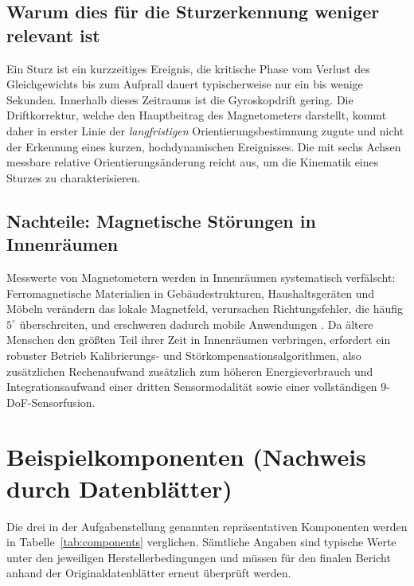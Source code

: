 \documentclass[11pt,a4paper,oneside]{report}
\begin{document}
\subsection{Warum dies für die Sturzerkennung weniger relevant ist}
Ein Sturz ist ein kurzzeitiges Ereignis, die kritische Phase vom Verlust des
Gleichgewichts bis zum Aufprall dauert typischerweise nur ein bis wenige
Sekunden. Innerhalb dieses Zeitraums ist die Gyroskopdrift gering. Die
Driftkorrektur, welche den Hauptbeitrag des Magnetometers darstellt, kommt
daher in erster Linie der \emph{langfristigen} Orientierungsbestimmung zugute
und nicht der Erkennung eines kurzen, hochdynamischen Ereignisses. Die mit
sechs Achsen messbare relative Orientierungsänderung reicht aus, um die
Kinematik eines Sturzes zu charakterisieren.

\subsection{Nachteile: Magnetische Störungen in Innenräumen}
Messwerte von Magnetometern werden in Innenräumen systematisch verfälscht:
Ferromagnetische Materialien in Gebäudestrukturen, Haushaltsgeräten und
Möbeln verändern das lokale Magnetfeld, verursachen Richtungsfehler, die
häufig $5^{\circ}$ überschreiten, und erschweren dadurch mobile Anwendungen
\cite{pmc11991382,yang2024neurit,pubmed25347584}. Da ältere Menschen den
größten Teil ihrer Zeit in Innenräumen verbringen, erfordert ein robuster
Betrieb Kalibrierungs- und Störkompensationsalgorithmen, also zusätzlichen
Rechenaufwand \cite{pmc11991382,pubmed25347584} zusätzlich zum höheren
Energieverbrauch und Integrationsaufwand einer dritten Sensormodalität sowie
einer vollständigen 9-\ac{DoF}-Sensorfusion.

\section{Beispielkomponenten (Nachweis durch Datenblätter)}
\label{sec:datasheets}
Die drei in der Aufgabenstellung genannten repräsentativen Komponenten werden
in Tabelle~\ref{tab:components} verglichen. Sämtliche Angaben sind typische
Werte unter den jeweiligen Herstellerbedingungen und müssen für den finalen
Bericht anhand der Originaldatenblätter erneut überprüft werden.
\end{document}
